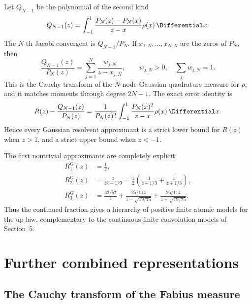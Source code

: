 \documentclass[11pt]{article}
\theoremstyle{definition}
\theoremstyle{remark}
\begin{document}
Let \(Q_{N-1}\) be the polynomial of the second kind
\begin{equation}
 Q_{N-1}(z)=\int_{-1}^{1}
 \frac{P_N(z)-P_N(x)}{z-x}\rho(x)\,\Differential x.                    \label{p6:eq:second-kind}
\end{equation}
The \(N\)-th Jacobi convergent is \(Q_{N-1}/P_N\).  If
\(x_{1,N},\dots,x_{N,N}\) are the zeros of \(P_N\), then
\begin{equation}
 \boxed{
 \frac{Q_{N-1}(z)}{P_N(z)}
 =\sum_{j=1}^{N}\frac{w_{j,N}}{z-x_{j,N}},
 \qquad w_{j,N}>0,\quad \sum_jw_{j,N}=1.
 }                                                           \label{p6:eq:gauss-partial}
\end{equation}
This is the Cauchy transform of the \(N\)-node Gaussian quadrature measure for \(\rho\),
and it matches moments through degree \(2N-1\).  The exact error identity is
\begin{equation}
 R(z)-\frac{Q_{N-1}(z)}{P_N(z)}
 =\frac1{P_N(z)^2}\int_{-1}^{1}
 \frac{P_N(x)^2}{z-x}\rho(x)\,\Differential x.                        \label{p6:eq:Markov-error}
\end{equation}
Hence every Gaussian resolvent approximant is a strict lower bound for \(R(z)\) when
\(z>1\), and a strict upper bound when \(z<-1\).

The first nontrivial approximants are completely explicit:
\begin{align}
 R_1^{\mathrm G}(z)&=\frac1z,\\
 R_2^{\mathrm G}(z)&=\frac{z}{z^2-1/9}
 =\frac12\left(\frac1{z-1/3}+\frac1{z+1/3}\right),\\
 R_3^{\mathrm G}(z)&=
 \frac{32/57}{z}
 +\frac{25/114}{z-\sqrt{19/75}}
 +\frac{25/114}{z+\sqrt{19/75}}.
\end{align}
Thus the continued fraction gives a hierarchy of positive finite atomic models for the
up-law, complementary to the continuous finite-convolution models of Section~5.

\section{Further combined representations}

\subsection{The Cauchy transform of the Fabius measure}
\end{document}
